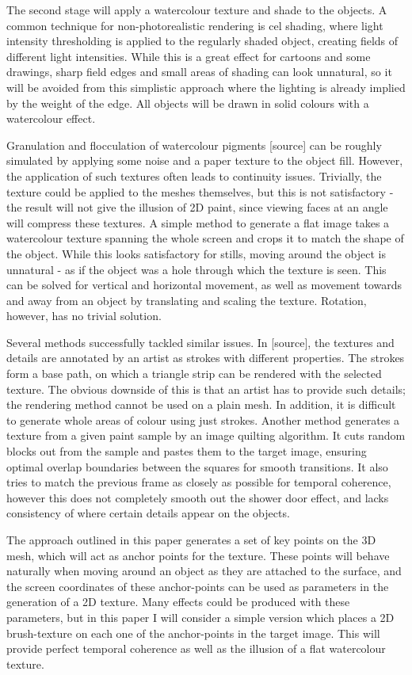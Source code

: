 \documentclass[a4paper, 12pt]{article}
\begin{document}
The second stage will apply a watercolour texture and shade to the objects. A common technique for non-photorealistic rendering is cel shading, where light intensity thresholding is applied to the regularly shaded object, creating fields of different light intensities. While this is a great effect for cartoons and some drawings, sharp field edges and small areas of shading can look unnatural, so it will be avoided from this simplistic approach where the lighting is already implied by the weight of the edge. All objects will be drawn in solid colours with a watercolour effect.

Granulation and flocculation of watercolour pigments [source] can be roughly simulated by applying some noise and a paper texture to the object fill. However, the application of such textures often leads to continuity issues. Trivially, the texture could be applied to the meshes themselves, but this is not satisfactory - the result will not give the illusion of 2D paint, since viewing faces at an angle will compress these textures. A simple method to generate a flat image takes a watercolour texture spanning the whole screen and crops it to match the shape of the object. While this looks satisfactory for stills, moving around the object is unnatural - as if the object was a hole through which the texture is seen. This can be solved for vertical and horizontal movement, as well as movement towards and away from an object by translating and scaling the texture. Rotation, however, has no trivial solution.

Several methods successfully tackled similar issues. In [source], the textures and details are annotated by an artist as strokes with different properties. The strokes form a base path, on which a triangle strip can be rendered with the selected texture. The obvious downside of this is that an artist has to provide such details; the rendering method cannot be used on a plain mesh. In addition, it is difficult to generate whole areas of colour using just strokes. Another method generates a texture from a given paint sample by an image quilting algorithm. It cuts random blocks out from the sample and pastes them to the target image, ensuring optimal overlap boundaries between the squares for smooth transitions. It also tries to match the previous frame as closely as possible for temporal coherence, however this does not completely smooth out the shower door effect, and lacks consistency of where certain details appear on the objects.

The approach outlined in this paper generates a set of key points on the 3D mesh, which will act as anchor points for the texture. These points will behave naturally when moving around an object as they are attached to the surface, and the screen coordinates of these anchor-points can be used as parameters in the generation of a 2D texture. Many effects could be produced with these parameters, but in this paper I will consider a simple version which places a 2D brush-texture on each one of the anchor-points in the target image. This will provide perfect temporal coherence as well as the illusion of a flat watercolour texture.
\end{document}
